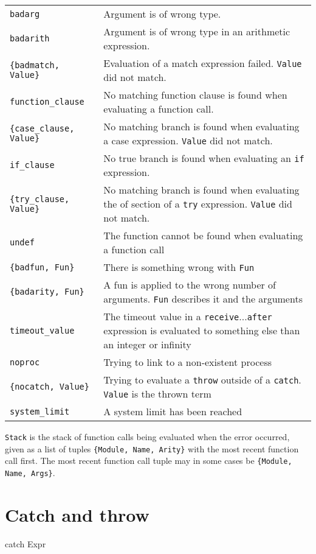 \begin{center}
\begin{tabular}{|>{\raggedright}p{100pt}|>{\raggedright}p{226pt}|}
\hline
\multicolumn{2}{|p{326pt}|}{Exit reasons}\tabularnewline
\hline
\texttt{badarg}  & Argument is of wrong type. \tabularnewline
\hline
\texttt{badarith}  & Argument is of wrong type in an arithmetic expression. \tabularnewline
\hline
\texttt{\{badmatch, Value\}}  & Evaluation of a match expression failed. \texttt{Value} did not match.
\tabularnewline
\hline
\texttt{function\_clause}  & No matching function clause is found when evaluating a function
call. \tabularnewline
\hline
\texttt{\{case\_clause, Value\}}  & No matching branch is found when evaluating a case expression.
\texttt{Value} did not match. \tabularnewline
\hline
\texttt{if\_clause}  & No true branch is found when evaluating an \texttt{if} expression. \tabularnewline
\hline
\texttt{\{try\_clause, Value\}}  & No matching branch is found when evaluating the of section
of a \texttt{try} expression. \texttt{Value} did not match. \tabularnewline
\hline
\texttt{undef}  & The function cannot be found when evaluating a function call\tabularnewline
\hline
\texttt{\{badfun, Fun\}}  & There is something wrong with \texttt{Fun}\tabularnewline
\hline
\texttt{\{badarity, Fun\}}  & A fun is applied to the wrong number of arguments. \texttt{Fun} describes
it and the arguments\tabularnewline
\hline
\texttt{timeout\_value}  & The timeout value in a \texttt{receive}$...$\texttt{after} expression is evaluated
to something else than an integer or infinity\tabularnewline
\hline
\texttt{noproc}  & Trying to link to a non-existent process\tabularnewline
\hline
\texttt{\{nocatch, Value\}}  & Trying to evaluate a \texttt{throw} outside of a \texttt{catch}. \texttt{Value} is the thrown
term\tabularnewline
\hline
\texttt{system\_limit}  & A system limit has been reached\tabularnewline
\hline
\end{tabular}
\end{center}

\texttt{Stack} is the stack of function calls being evaluated when the error
occurred, given as a list of tuples \texttt{\{Module, Name, Arity\}}
with the most recent function call first.  The most recent function
call tuple may in some cases be \texttt{\{Module, Name, Args\}}.


\section{Catch and throw}
\label{errorhandling:catchthrow}
\begin{erlang}
catch Expr
\end{erlang}

